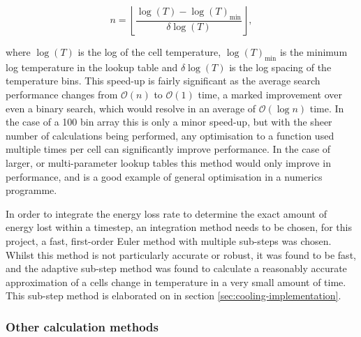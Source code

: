 \begin{equation}
    n = \left \lfloor \frac{\log(T) - \log(T)_\text{min}}{\delta \log (T)} \right \rfloor ,
\end{equation}

\noindent
where $\log(T)$ is the log of the cell temperature, $\log (T)_\text{min}$ is the minimum log temperature in the lookup table and $\delta \log (T)$ is the log spacing of the temperature bins. 
This speed-up is fairly significant as the average search performance changes from $\mathcal{O}(n)$ to $\mathcal{O}(1)$ time, a marked improvement over even a binary search, which would resolve in an average of $\mathcal{O}(\log n)$ time.
In the case of a 100 bin array this is only a minor speed-up, but with the sheer number of calculations being performed, any optimisation to a function used multiple times per cell can significantly improve performance.
In the case of larger, or multi-parameter lookup tables this method would only improve in performance, and is a good example of general optimisation in a numerics programme.

In order to integrate the energy loss rate to determine the exact amount of energy lost within a timestep, an integration method needs to be chosen, for this project, a fast, first-order Euler method with multiple sub-steps was chosen. Whilst this method is not particularly accurate or robust, it was found to be fast, and the adaptive sub-step method was found to calculate a reasonably accurate approximation of a cells change in temperature in a very small amount of time. This sub-step method is elaborated on in section \ref{sec:cooling-implementation}.

\subsubsection{Other calculation methods}

